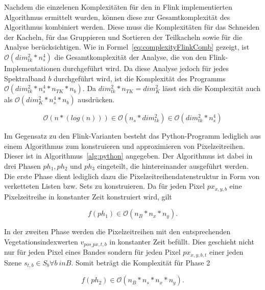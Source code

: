 Nachdem die einzelenen Komplexitäten für den in Flink implementierten Algorithmus ermittelt wurden, können diese zur Gesamtkomplexität des Algorithmus kombiniert werden. Diese muss die Komplexitäten für das Schneiden der Kacheln, für das Gruppieren und Sortieren der Teilkacheln sowie für die Analyse berücksichtigen. Wie in Formel~\ref{eq:complexityFlinkComb} gezeigt, ist $\mathcal{O}(dim_{tk}^2 * n_s^4)$ die Gesamtkomplexität der Analyse, die von den Flink-Implementationen durchgeführt wird. Da diese Analyse jedoch für jedes Spektralband $b$ durchgeführt wird, ist die Komplexität des Programms $\mathcal{O}(dim_{tk}^2 * n_s^4 * n_{TK} * n_b)$. Da $dim_{tk}^2 * n_{TK} = dim_{K}^2$ lässt sich die Komplexität auch als $\mathcal{O}(dim_{K}^2 * n_s^4 * n_b)$ ausdrücken.

\begin{equation} \label{eq:complexityFlinkComb}
\mathcal{O}(n*(log(n))) \in \mathcal{O}(n_s * dim_{tk}^2) \in \mathcal{O}(dim_{tk}^2 * n_s^4)
\end{equation}

Im Gegensatz zu den Flink-Varianten besteht das Python-Programm lediglich aus einem Algorithmus zum konstruieren und approximieren von Pixelzeitreihen. Dieser ist in Algorithmus~\ref{alg:python} angegeben. Der Algorithmus ist dabei in drei Phasen $ph_1, ph_2$ und $ph_3$ eingeteilt, die hintereinander ausgeführt werden. Die erste Phase dient lediglich dazu die Pixelzeitreihendatenstruktur in Form von verketteten Listen bzw. Sets zu konstruieren. Da für jeden Pixel $px_{x, y, b}$ eine Pixelzeitreihe in konstanter Zeit konstruiert wird, gilt  

\begin{equation} \label{eq:complexityPython1}
f(ph_1) \in \mathcal{O}(n_B * n_x * n_y).
\end{equation}


In der zweiten Phase werden die Pixelzeitreihen mit den entsprechenden Vegetationsindexwerten $v_{pos\_px, t, b}$ in konstanter Zeit befüllt. Dies geschieht nicht nur für jeden Pixel eines Bandes sondern für jeden Pixel $px_{x, y, b, t}$ einer jeden Szene $s_{t, b} \in S_b \forall b \ in B$. Somit beträgt die Komplexität für Phase 2 
 
\begin{equation} \label{eq:complexityPython2}
f(ph_2) \in \mathcal{O}(n_B * n_s * n_x * n_y).
\end{equation}
 
